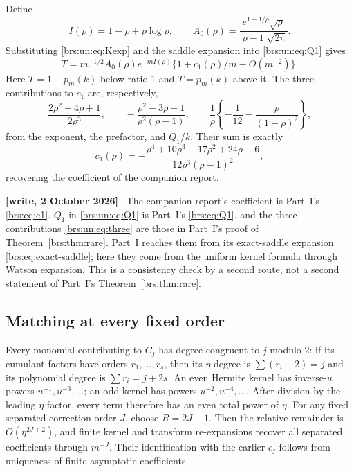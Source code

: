 \documentclass[11pt]{article}
\numberwithin{equation}{section}
\theoremstyle{remark}\newtheorem{remark}[theorem]{Remark}
\newenvironment{writenote}{\par\smallskip\begingroup\small\noindent\textbf{[write, 2 October 2026]}\ }{\par\endgroup\smallskip}
\begin{document}
Define
\begin{equation}\label{brs:un:eq:rate}
 I(\rho)=1-\rho+\rho\log\rho,\qquad
 A_0(\rho)=\frac{e^{1-1/\rho}\sqrt\rho}
                  {|\rho-1|\sqrt{2\pi}}.
\end{equation}
Substituting \eqref{brs:un:eq:Kexp} and the saddle expansion into
\eqref{brs:un:eq:Q1} gives
\begin{equation}\label{brs:un:eq:rare}
 T=m^{-1/2}A_0(\rho)e^{-mI(\rho)}
       \{1+c_1(\rho)/m+O(m^{-2})\}.
\end{equation}
Here $T=1-p_m(k)$ below ratio $1$ and $T=p_m(k)$ above it.
The three contributions to $c_1$ are, respectively,
\begin{equation}\label{brs:un:eq:three}
 \frac{2\rho^2-4\rho+1}{2\rho^3},\qquad
 -\frac{\rho^2-3\rho+1}{\rho^2(\rho-1)},\qquad
 \frac1\rho\left\{-\frac1{12}-\frac{\rho}{(1-\rho)^2}\right\},
\end{equation}
from the exponent, the prefactor, and $Q_1/k$.  Their sum is exactly
\begin{equation}\label{brs:un:eq:c1}
 c_1(\rho)=
 -\frac{\rho^4+10\rho^3-17\rho^2+24\rho-6}
        {12\rho^3(\rho-1)^2},
\end{equation}
recovering the coefficient of the companion report.

\begin{writenote}
The companion report's coefficient is Part~I's \eqref{brs:eq:c1}. $Q_1$ in \eqref{brs:un:eq:Q1} is Part~I's \eqref{brs:eq:Q1}, and the three contributions \eqref{brs:un:eq:three} are those in Part~I's proof of Theorem~\ref{brs:thm:rare}. Part~I reaches them from its exact-saddle expansion \eqref{brs:eq:exact-saddle}; here they come from the uniform kernel formula through Watson expansion. This is a consistency check by a second route, not a second statement of Part~I's Theorem~\ref{brs:thm:rare}.
\end{writenote}

\subsection{Matching at every fixed order}

Every monomial contributing to $C_j$ has degree congruent to $j$
modulo $2$: if its cumulant factors have orders $r_1,\ldots,r_s$,
then its $\eta$-degree is $\sum(r_i-2)=j$ and its polynomial degree
is $\sum r_i=j+2s$.  An even Hermite kernel has inverse-$u$
powers $u^{-1},u^{-3},\ldots$; an odd kernel has powers
$u^{-2},u^{-4},\ldots$.  After division by the leading $\eta$
factor, every term therefore has an even total power of $\eta$.
For any fixed separated correction order $J$, choose $R=2J+1$.
Then the relative remainder is $O(\eta^{2J+2})$, and finite kernel
and transform re-expansions recover all separated coefficients
through $m^{-J}$.  Their identification with the earlier $c_j$
follows from uniqueness of finite asymptotic coefficients.
\end{document}
